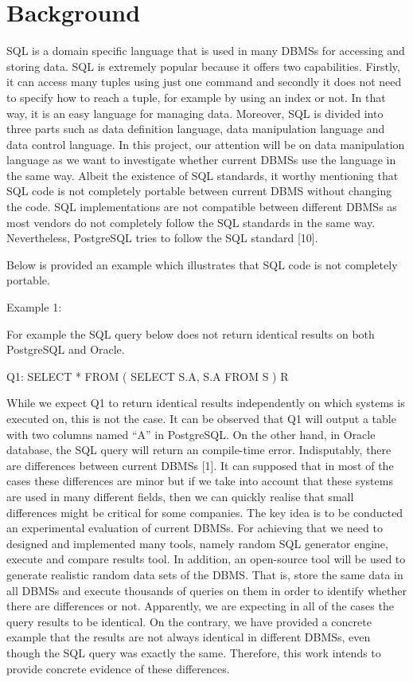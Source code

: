 
\chapter{Background}

SQL is a domain specific language that is used in many DBMSs for accessing and storing data. SQL is extremely popular because it offers two capabilities. Firstly, it can access many tuples using just one command and secondly it does not need to specify how to reach a tuple, for example by using an index or not. In that way, it is an easy language for managing data. Moreover, SQL is divided into three parts such as data definition language, data manipulation language and data control language. In this project, our attention will be on data manipulation language as we want to investigate whether current DBMSs use the language in the same way. 
Albeit the existence of SQL standards, it worthy mentioning that SQL code is not completely portable between current DBMS without changing the code. SQL implementations are not compatible between different DBMSs as most vendors do not completely follow the SQL standards in the same way. Nevertheless, PostgreSQL tries to follow the SQL standard [10]. 


 
 
Below is provided an example which illustrates that SQL code is not completely portable.
 
 
Example 1:
 
For example the SQL query below does not return identical results on both PostgreSQL and Oracle.   
 
Q1: SELECT * 
          FROM ( SELECT S.A, S.A FROM S ) R


While we expect Q1 to return identical results independently on which systems is executed on, this is not the case. It can be observed that Q1 will output a table with two columns named “A” in PostgreSQL. On the other hand, in Oracle database, the SQL query will return an compile-time error. Ιndisputably, there are differences between current DBMSs [1]. 
It can supposed that in most of the cases these differences are minor but if we take into account that these systems are used in many different fields, then we can quickly realise that small differences might be critical for some companies. The key idea is to be conducted an experimental evaluation of current DBMSs. For achieving that we need to designed and implemented many tools, namely random SQL generator engine, execute and compare results tool. In addition, an open-source tool will be used to generate realistic random data sets of the DBMS. That is, store the same data in all DBMSs and execute thousands of queries on them in order to identify whether there are differences or not. Apparently, we are expecting in all of the cases the query results to be identical. On the contrary, we have provided a concrete example that the results are not always identical in different DBMSs, even though the SQL query was exactly the same. Therefore, this work intends to provide concrete evidence of these differences.

 